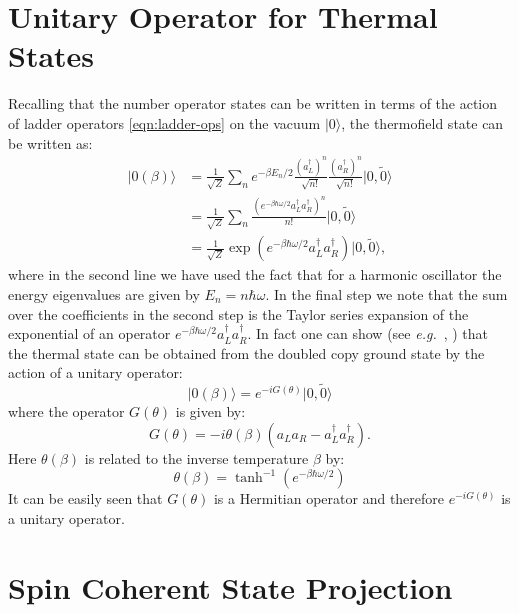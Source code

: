 \documentclass[twocolumn,draft,aps,nofootinbib,nobibnotes,final]{revtex4-2}
\newcommand{\eg}{\textit{e.g.}~}
\newcommand{\ket}[1]{\vert #1 \rangle}
\begin{document}
\section{Unitary Operator for Thermal States}\label{sec:thermal-unitary}

Recalling that the number operator states can be written in terms of the action of ladder operators \eqref{eqn:ladder-ops} on the vacuum $ \ket{0} $, the thermofield state can be written as:
\begin{align}
	\ket{0(\beta)} & = \frac{1}{\sqrt{Z}} \sum_n e^{-\beta E_n/2} \frac{(a_L^\dagger)^n}{\sqrt{n!}} \frac{(a_R^\dagger)^n}{\sqrt{n!}} \ket{0,\tilde 0} \nonumber \\
	& = \frac{1}{\sqrt{Z}} \sum_n \frac{\left( e^{-\beta \hbar \omega/2} a_L^\dagger a_R^\dagger \right)^n}{n!} \ket{0,\tilde 0} \nonumber \\
	& = \frac{1}{\sqrt{Z}} \exp{\left(e^{-\beta \hbar \omega/2} a_L^\dagger a_R^\dagger \right) } \ket{0,\tilde 0},
\end{align}
where in the second line we have used the fact that for a harmonic oscillator the energy eigenvalues are given by $ E_n = n \hbar \omega $. In the final step we note that the sum over the coefficients in the second step is the Taylor series expansion of the exponential of an operator $ e^{-\beta \hbar \omega/2} a_L^\dagger a_R^\dagger $. In fact one can show (see \eg, \cite[Sec 6]{Khanna2009Thermal}) that the thermal state can be obtained from the doubled copy ground state by the action of a unitary operator:
\begin{equation}\label{eqn:unitary-op-action}
	\ket{0(\beta)} = e^{-i G(\theta)} \ket{0,\tilde 0}
\end{equation}
where the operator $ G(\theta) $ is given by:
\begin{equation}\label{eqn:unitary-op-generator}
	G(\theta) = -i \theta(\beta) (a_L a_R - a_L^\dagger a_R^\dagger).
\end{equation}
Here $ \theta(\beta) $ is related to the inverse temperature $ \beta $ by:
\begin{equation}\label{eqn:temp-theta-relation}
	\theta(\beta) = \tanh^{-1}(e^{-\beta \hbar \omega/2})
\end{equation}
It can be easily seen that $ G(\theta) $ is a Hermitian operator and therefore $ e^{-iG(\theta)} $ is a unitary operator.

\section{Spin Coherent State Projection}\label{sec:spin-projection}
\end{document}
